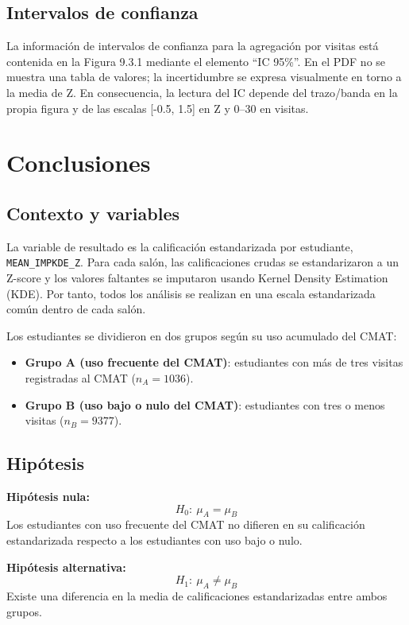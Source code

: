 \documentclass[8pt,a4paper]{article} %
\numberwithin{figure}{subsection}
\begin{document}
\subsection{Intervalos de confianza}
La información de intervalos de confianza para la agregación por visitas está contenida en la Figura 9.3.1 mediante el elemento ``IC 95\%''.
En el PDF no se muestra una tabla de valores; la incertidumbre se expresa visualmente en torno a la media de Z.
En consecuencia, la lectura del IC depende del trazo/banda en la propia figura y de las escalas [-0.5, 1.5] en Z y 0--30 en visitas.


\newpage
\section{Conclusiones}


\subsection{Contexto y variables}

La variable de resultado es la calificación estandarizada por estudiante,
\texttt{MEAN\_IMPKDE\_Z}. Para cada salón, las calificaciones crudas se
estandarizaron a un Z-score y los valores faltantes se imputaron usando
Kernel Density Estimation (KDE). Por tanto, todos los análisis se realizan
en una escala estandarizada común dentro de cada salón.

Los estudiantes se dividieron en dos grupos según su uso acumulado del CMAT:
\begin{itemize}
  \item \textbf{Grupo A (uso frecuente del CMAT)}: estudiantes con más de tres
        visitas registradas al CMAT ($n_A = 1036$).
  \item \textbf{Grupo B (uso bajo o nulo del CMAT)}: estudiantes con tres o menos
        visitas ($n_B = 9377$).
\end{itemize}

\subsection{Hipótesis}

\textbf{Hipótesis nula:}
\[
H_0:\ \mu_A = \mu_B
\]
Los estudiantes con uso frecuente del CMAT no difieren en su calificación
estandarizada respecto a los estudiantes con uso bajo o nulo.

\textbf{Hipótesis alternativa:}
\[
H_1:\ \mu_A \neq \mu_B
\]
Existe una diferencia en la media de calificaciones estandarizadas entre ambos grupos.
\end{document}

